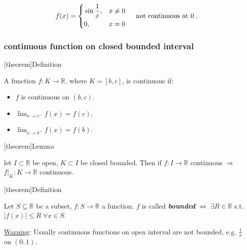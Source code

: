 \documentclass[12pt]{report}
\theoremstyle{definition}
\begin{document}
\begin{ex}
    \[
        f(x) = \left\{
            \begin{align*}
                & \sin{\frac{1}{x}}, & x \neq 0 \\
                & 0, & x = 0
            \end{align*}
            \right.\quad\;\textnormal{not continuous at 0}\;.
    \]
\end{ex}

\subsubsection{continuous function on closed bounded interval}

[theorem]{Definition}
\begin{continuous for closed function}
    A function $f:K\rightarrow{}\mathbb{R}$, where $K = [b,c]$, is continuous if:
    \begin{itemize}
        \item $f$ is continuous on $(b,c)$.
        \item $\lim_{x\rightarrow{}c^{-}}f(x) = f(c)$.
        \item $\lim_{x\rightarrow{}b^{+}}f(x) = f(b)$.
    \end{itemize}
\end{continuous for closed function}

[theorem]{Lemma}
\begin{closed bound in open interval is continuous}
    let $I \subset \mathbb{R}$ be open, $K \subset I$ be closed bounded.
    Then if $f:I\rightarrow{}\mathbb{R}$ continuous $\Rightarrow{}$
    $f|_K:K\rightarrow{}\mathbb{R}$ continuous.
\end{closed bound in open interval is continuous}

[theorem]{Definition}
\begin{bounded function}
    Let $S \subseteq \mathbb{R}$ be a subset, $f:S\rightarrow{}\mathbb{R}$ a function.
    $f$ is called \textbf{\emph{bounded}} $\iff$
    $\exists R\in\mathbb{R}$ s.t. $|f(x)|\le R \;\forall x \in S$.
\end{bounded function}

\underline{Warning}: Usually continuous functions on open interval are not bounded,
e.g. $\frac{1}{x}$ on $(0,1)$.
\end{document}
